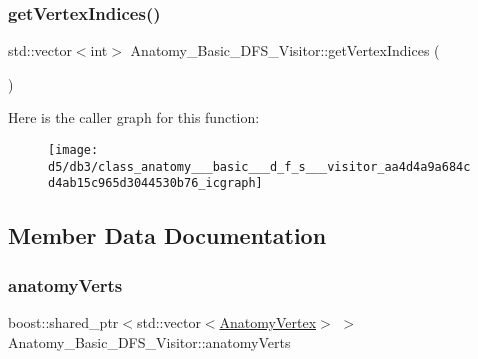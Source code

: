 \mbox{\label{class_anatomy___basic___d_f_s___visitor_aa4d4a9a684cd4ab15c965d3044530b76}} 
\subsubsection{\texorpdfstring{get\+Vertex\+Indices()}{getVertexIndices()}}
{\footnotesize\ttfamily std\+::vector$<$int$>$ Anatomy\+\_\+\+Basic\+\_\+\+D\+F\+S\+\_\+\+Visitor\+::get\+Vertex\+Indices (\begin{DoxyParamCaption}{ }\end{DoxyParamCaption})\hspace{0.3cm}{\ttfamily [inline]}}

Here is the caller graph for this function\+:
\nopagebreak
\begin{figure}[H]
\begin{center}
\leavevmode
\texttt{[image: d5/db3/class\_anatomy\_\_\_basic\_\_\_d\_f\_s\_\_\_visitor\_aa4d4a9a684cd4ab15c965d3044530b76\_icgraph]}
\end{center}
\end{figure}


\subsection{Member Data Documentation}
\mbox{\label{class_anatomy___basic___d_f_s___visitor_a0b28d945f501686b8037b49bb9ab75b2}} 
\subsubsection{\texorpdfstring{anatomy\+Verts}{anatomyVerts}}
{\footnotesize\ttfamily boost\+::shared\+\_\+ptr$<$std\+::vector$<$\mbox{\hyperlink{_body_graph_8hpp_aeb92fc7b3eed88cf25a4fc7b708a66cf}{Anatomy\+Vertex}}$>$ $>$ Anatomy\+\_\+\+Basic\+\_\+\+D\+F\+S\+\_\+\+Visitor\+::anatomy\+Verts\hspace{0.3cm}{\ttfamily [private]}}

